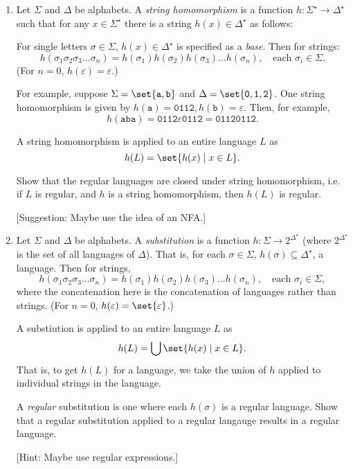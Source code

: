 \documentclass{cs81-homework}
\begin{document}
\begin{enumerate}
  \begin{solution}
  \end{solution}

\item {} Let \(\Sigma\) and \(\Delta\) be alphabets.  A \emph{string
    homomorphism} is a function \(h \colon \Sigma^\star \to \Delta^\star\) such
  that for any \(x \in \Sigma^\star\) there is a string
  \(h(x) \in \Delta^\star\) as follows:

  For single letters \(\sigma \in \Sigma\), \(h(x) \in \Delta^\star\) is
  specified as a \emph{base}.  Then for strings:
  \[
    h(\sigma_1 \sigma_2 \sigma_3 \dots \sigma_n) = h(\sigma_1) h(\sigma_2)
    h(\sigma_3) \dots h(\sigma_n), \quad \text{each \(\sigma_i \in \Sigma\)}.
  \]
  (For \(n = 0\), \(h(\varepsilon) = \varepsilon\).)

  For example, suppose \(\Sigma = \set{\mathtt a, \mathtt b}\) and
  \(\Delta = \set{\mathtt 0, \mathtt 1, \mathtt 2}\).  One string homomorphism
  is given by \(h(\mathtt a) = \mathtt{0112}, h(\mathtt b) = \varepsilon\).
  Then, for example,
  \[
    h(\mathtt{aba}) = \mathtt{0112}\varepsilon\mathtt{0112} = \mathtt{01120112}.
  \]

  A string homomorphism is applied to an entire language \(L\) as
  \[
    h(L) = \set{h(x) \mid x \in L}.
  \]

  Show that the regular languages are closed under string homomorphism, i.e. if
  \(L\) is regular, and \(h\) is a string homomorphism, then \(h(L)\) is
  regular.

  [Suggestion: Maybe use the idea of an NFA.]

  \begin{solution}
  \end{solution}

\item {} Let \(\Sigma\) and \(\Delta\) be alphabets.  A
  \emph{substitution} is a function \(h \colon \Sigma \to 2^{\Delta^\star}\)
  (where \(2^{\Delta^\star}\) is the set of all languages of \(\Delta\)).  That
  is, for each \(\sigma \in \Sigma\), \(h(\sigma) \subseteq \Delta^\star\), a
  language.  Then for strings,
  \[
    h(\sigma_1 \sigma_2 \sigma_3 \dots \sigma_n) = h(\sigma_1) h(\sigma_2)
    h(\sigma_3) \dots h(\sigma_n), \quad \text{each \(\sigma_i \in \Sigma\)},
  \]
  where the concatenation here is the concatenation of languages rather than
  strings.  (For \(n = 0\), \(h(\varepsilon) = \set{\varepsilon}\).)

  A substiution is applied to an entire language \(L\) as
  \[
    h(L) = \bigcup \set{h(x) \mid x \in L}.
  \]
  That is, to get \(h(L)\) for a language, we take the union of \(h\) applied to
  individual strings in the language.

  A \emph{regular} substitution is one where each \(h(\sigma)\) is a regular
  language.  Show that a regular substitution applied to a regular langauge
  results in a regular language.

  [Hint: Maybe use regular expressions.]
  
  \begin{solution}
  \end{solution}
  
\end{enumerate}
\end{document}

